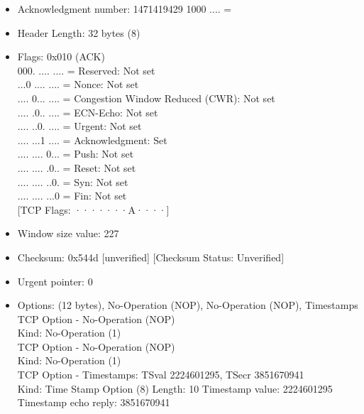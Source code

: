 \documentclass[14pt]{extarticle}
\begin{document}
\begin{itemize}
\begin{itemize}
                \item Acknowledgment number: 1471419429 1000 .... = 
                \item Header Length: 32 bytes (8)    
                \item Flags: 0x010 (ACK)\\        
                000. .... .... = Reserved: Not set\\        
                ...0 .... .... = Nonce: Not set\\        
                .... 0... .... = Congestion Window Reduced (CWR): Not set\\        
                .... .0.. .... = ECN-Echo: Not set\\        
                .... ..0. .... = Urgent: Not set\\        
                .... ...1 .... = Acknowledgment: Set\\
                .... .... 0... = Push: Not set\\
                .... .... .0.. = Reset: Not set\\
                .... .... ..0. = Syn: Not set\\        
                .... .... ...0 = Fin: Not set\\        
                {[TCP Flags: ·······A····]}    
                \item Window size value: 227
                \item Checksum: 0x544d {[unverified]}    {[Checksum Status: Unverified]}    
                \item Urgent pointer: 0    
                \item Options: (12 bytes), No-Operation (NOP), No-Operation (NOP), Timestamps\\
                TCP Option - No-Operation (NOP)\\            
                Kind: No-Operation (1)\\        
                TCP Option - No-Operation (NOP)\\            
                Kind: No-Operation (1)\\        
                TCP Option - Timestamps: TSval 2224601295, TSecr 3851670941\\            
                Kind: Time Stamp Option (8)            Length: 10            
                Timestamp value: 2224601295            Timestamp echo reply: 3851670941
            \end{itemize}
    \end{itemize}
\end{document}

